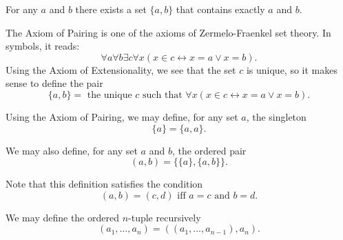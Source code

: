 \documentclass[12pt]{article}
\begin{document}
For any $a$ and $b$ there exists a set $\{ a, b \}$ that contains exactly $a$ and $b$.

The Axiom of Pairing is one of the axioms of Zermelo-Fraenkel set theory.  In symbols, it reads:
\[
\forall a \forall b \exists c \forall x (x \in c \leftrightarrow x = a \lor x = b).
\]
Using the Axiom of Extensionality, we see that the set $c$ is unique, so it makes sense to define the pair
\[
\{ a, b \} = \mbox{ the unique } c \mbox{ such that } \forall x (x \in c \leftrightarrow x = a \lor x = b).
\]

Using the Axiom of Pairing, we may define, for any set $a$, the singleton
\[
\{ a \} = \{ a, a \}.
\]

We may also define, for any set $a$ and $b$, the ordered pair
\[
(a, b) = \{ \{ a \}, \{ a, b \} \}.
\]

Note that this definition satisfies the condition
\[
(a, b) = (c, d) \mbox{ iff } a = c \mbox{ and } b = d.
\]

We may define the ordered $n$-tuple recursively
\[
(a_1, \ldots, a_n) = ((a_1, \ldots, a_{n-1}), a_n).
\]
\end{document}
